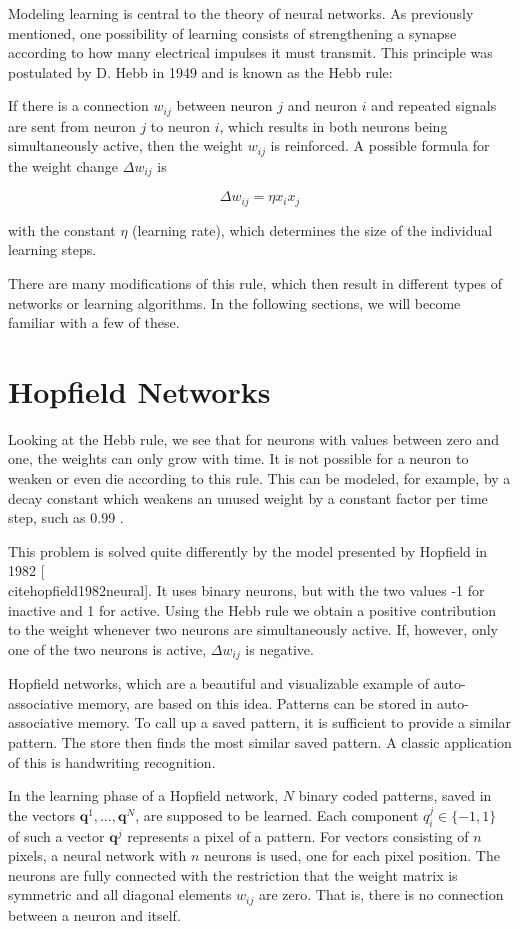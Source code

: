 \documentclass[10pt]{book}
\begin{document}
Modeling learning is central to the theory of neural networks. As previously mentioned, one possibility of learning consists of strengthening a synapse according to how many electrical impulses it must transmit. This principle was postulated by D. Hebb in 1949 and is known as the Hebb rule:

If there is a connection $w_{i j}$ between neuron $j$ and neuron $i$ and repeated signals are sent from neuron $j$ to neuron $i$, which results in both neurons being simultaneously active, then the weight $w_{i j}$ is reinforced. A possible formula for the weight change $\Delta w_{i j}$ is

$$
\Delta w_{i j}=\eta x_{i} x_{j}
$$

with the constant $\eta$ (learning rate), which determines the size of the individual learning steps.

There are many modifications of this rule, which then result in different types of networks or learning algorithms. In the following sections, we will become familiar with a few of these.

\section{Hopfield Networks}
Looking at the Hebb rule, we see that for neurons with values between zero and one, the weights can only grow with time. It is not possible for a neuron to weaken or even die according to this rule. This can be modeled, for example, by a decay constant which weakens an unused weight by a constant factor per time step, such as 0.99 .

This problem is solved quite differently by the model presented by Hopfield in 1982 [\\cite{hopfield1982neural}]. It uses binary neurons, but with the two values -1 for inactive and 1 for active. Using the Hebb rule we obtain a positive contribution to the weight whenever two neurons are simultaneously active. If, however, only one of the two neurons is active, $\Delta w_{i j}$ is negative.

Hopfield networks, which are a beautiful and visualizable example of auto-associative memory, are based on this idea. Patterns can be stored in auto-associative memory. To call up a saved pattern, it is sufficient to provide a similar pattern. The store then finds the most similar saved pattern. A classic application of this is handwriting recognition.

In the learning phase of a Hopfield network, $N$ binary coded patterns, saved in the vectors $\boldsymbol{q}^{1}, \ldots, \boldsymbol{q}^{N}$, are supposed to be learned. Each component $q_{i}^{j} \in\{-1,1\}$ of such a vector $\boldsymbol{q}^{j}$ represents a pixel of a pattern. For vectors consisting of $n$ pixels, a neural network with $n$ neurons is used, one for each pixel position. The neurons are fully connected with the restriction that the weight matrix is symmetric and all diagonal elements $w_{i j}$ are zero. That is, there is no connection between a neuron and itself.
\end{document}
